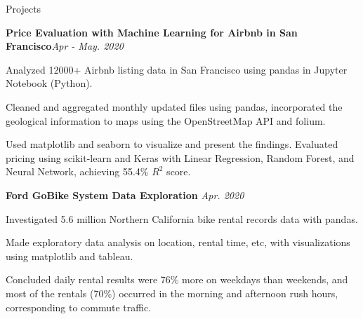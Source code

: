 \documentclass{resume} %
\begin{document}
%
%
\vspace{-9pt}
\begin{rSection}{Projects} 


\textbf{Price Evaluation with Machine Learning for Airbnb in San Francisco}\hfill {\em Apr - May. 2020}\\
\vspace{-15pt}
\begin{rSubsection}{}{}{}{}
\item Analyzed 12000+ Airbnb listing data in San Francisco using pandas in Jupyter Notebook (Python).
\item Cleaned and aggregated monthly updated files using pandas, incorporated the geological information to maps using the OpenStreetMap API and folium.
\item Used matplotlib and seaborn to visualize and present the findings. Evaluated pricing using scikit-learn and Keras with Linear Regression, Random Forest, and Neural Network, achieving 55.4\% $R^2$ score.
\end{rSubsection}

\vspace{-9pt}
\textbf{Ford GoBike System Data Exploration} \hfill {\em Apr. 2020}\\
\vspace{-15pt}
\begin{rSubsection}{}{}{}{}
\item Investigated 5.6 million Northern California bike rental records data with pandas.
\item Made exploratory data analysis on location, rental time, etc, with visualizations using matplotlib and tableau.
\item Concluded daily rental results were 76\% more on weekdays than weekends, and most of the rentals (70\%) occurred in the morning and afternoon rush hours, corresponding to commute traffic. 
\end{rSubsection}


\end{rSection}
\end{document}
